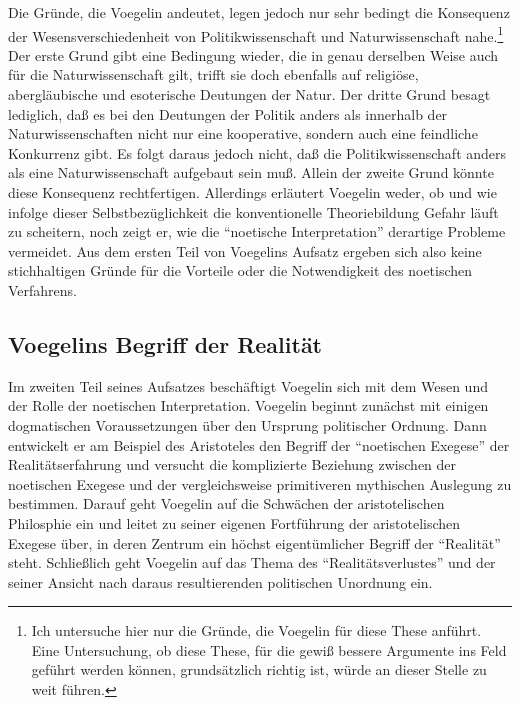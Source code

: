Die Gründe, die Voegelin andeutet, legen jedoch nur sehr bedingt die
Konsequenz der Wesensverschiedenheit von Politikwissenschaft und
Naturwissenschaft nahe.\footnote{Ich untersuche hier nur die Gründe, die
  Voegelin für diese These anführt. Eine Untersuchung, ob diese These, für die
  gewiß bessere Argumente ins Feld geführt werden können, grundsätzlich
  richtig ist, würde an dieser Stelle zu weit führen.} Der erste Grund gibt
eine Bedingung wieder, die in genau derselben Weise auch für die
Naturwissenschaft gilt, trifft sie doch ebenfalls auf religiöse,
abergläubische und esoterische Deutungen der Natur. Der dritte Grund besagt
lediglich, daß es bei den Deutungen der Politik anders als innerhalb der
Naturwissenschaften nicht nur eine kooperative, sondern auch eine feindliche
Konkurrenz gibt. Es folgt daraus jedoch nicht, daß die Politikwissenschaft
anders als eine Naturwissenschaft aufgebaut sein muß. Allein der zweite Grund
könnte diese Konsequenz rechtfertigen. Allerdings erläutert Voegelin weder, ob
und wie infolge dieser Selbstbezüglichkeit die konventionelle Theoriebildung
Gefahr läuft zu scheitern, noch zeigt er, wie die "`noetische Interpretation"'
derartige Probleme vermeidet. Aus dem ersten Teil von Voegelins Aufsatz
ergeben sich also keine stichhaltigen Gründe für die Vorteile oder
die Notwendigkeit des noetischen Verfahrens.


\subsection{Voegelins Begriff der Realität}
 
Im zweiten Teil seines Aufsatzes beschäftigt Voegelin sich mit dem Wesen und
der Rolle der noetischen Interpretation. Voegelin beginnt zunächst mit einigen
dogmatischen Voraussetzungen über den Ursprung politischer Ordnung.  Dann
entwickelt er am Beispiel des Aristoteles den Begriff der "`noetischen
Exegese"' der Realitätserfahrung und versucht die komplizierte Beziehung
zwischen der noetischen Exegese und der vergleichsweise primitiveren
mythischen Auslegung zu bestimmen. Darauf geht Voegelin auf die Schwächen der
aristotelischen Philosphie ein und leitet zu seiner eigenen Fortführung der
aristotelischen Exegese über, in deren Zentrum ein höchst eigentümlicher
Begriff der "`Realität"' steht. Schließlich geht Voegelin auf das Thema des
"`Realitätsverlustes"' und der seiner Ansicht nach daraus resultierenden
politischen Unordnung ein.
 
